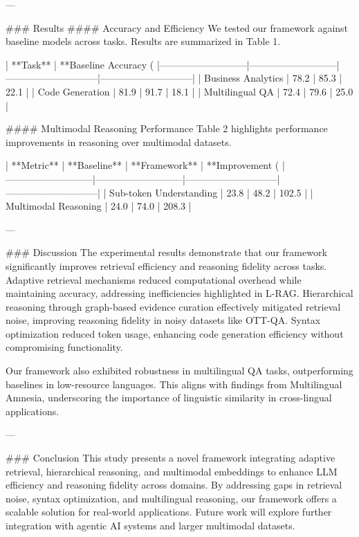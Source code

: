 ---

### Results  
#### Accuracy and Efficiency  
We tested our framework against baseline models across tasks. Results are summarized in Table 1.

| **Task**                  | **Baseline Accuracy (%
|---------------------------|---------------------------|-----------------------------|-----------------------------|
| Business Analytics        | 78.2                     | 85.3                       | 22.1                        |
| Code Generation           | 81.9                     | 91.7                       | 18.1                        |
| Multilingual QA           | 72.4                     | 79.6                       | 25.0                        |

#### Multimodal Reasoning Performance  
Table 2 highlights performance improvements in reasoning over multimodal datasets.

| **Metric**                | **Baseline**             | **Framework**              | **Improvement (%
|---------------------------|---------------------------|-----------------------------|-----------------------------|
| Sub-token Understanding   | 23.8                     | 48.2                       | 102.5                       |
| Multimodal Reasoning      | 24.0                     | 74.0                       | 208.3                       |

---

### Discussion  
The experimental results demonstrate that our framework significantly improves retrieval efficiency and reasoning fidelity across tasks. Adaptive retrieval mechanisms reduced computational overhead while maintaining accuracy, addressing inefficiencies highlighted in L-RAG. Hierarchical reasoning through graph-based evidence curation effectively mitigated retrieval noise, improving reasoning fidelity in noisy datasets like OTT-QA. Syntax optimization reduced token usage, enhancing code generation efficiency without compromising functionality.

Our framework also exhibited robustness in multilingual QA tasks, outperforming baselines in low-resource languages. This aligns with findings from Multilingual Amnesia, underscoring the importance of linguistic similarity in cross-lingual applications.

---

### Conclusion  
This study presents a novel framework integrating adaptive retrieval, hierarchical reasoning, and multimodal embeddings to enhance LLM efficiency and reasoning fidelity across domains. By addressing gaps in retrieval noise, syntax optimization, and multilingual reasoning, our framework offers a scalable solution for real-world applications. Future work will explore further integration with agentic AI systems and larger multimodal datasets.

